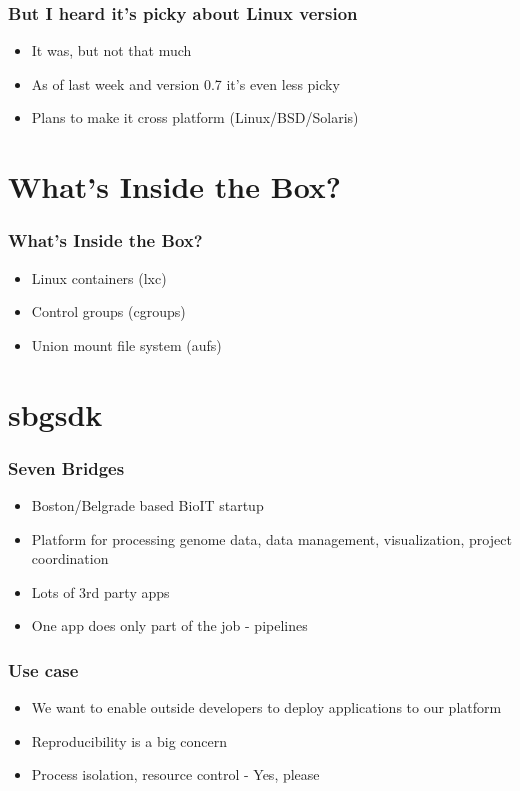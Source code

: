 \documentclass{beamer}
\begin{document}
  \begin{frame}
  	\frametitle{But I heard it's picky about Linux version}
	\begin{itemize}
		\item It was, but not that much
  		\item As of last week and version 0.7 it's even less picky
  		\item Plans to make it cross platform (Linux/BSD/Solaris)
  	\end{itemize}
  \end{frame}
  
  \section{What's Inside the Box?}
  \begin{frame}
  	\frametitle{What's Inside the Box?}
    \begin{itemize}
    	\item Linux containers (lxc)
        \item Control groups (cgroups)
        \item Union mount file system (aufs)
    \end{itemize}
  \end{frame}
    
  \section{sbgsdk}
  \begin{frame}
    \frametitle{Seven Bridges}
    \begin{itemize}
    	\item Boston/Belgrade based BioIT startup
    	\item Platform for processing genome data, data management, visualization, project coordination
    	\item Lots of 3rd party apps
    	\item One app does only part of the job - pipelines
    \end{itemize}
  \end{frame}

  \begin{frame}
    \frametitle{Use case}
    \begin{itemize}
    	\item We want to enable outside developers to deploy applications to our platform
    	\item Reproducibility is a big concern
    	\item Process isolation, resource control - Yes, please
    \end{itemize}
  \end{frame}
  
\end{document}
